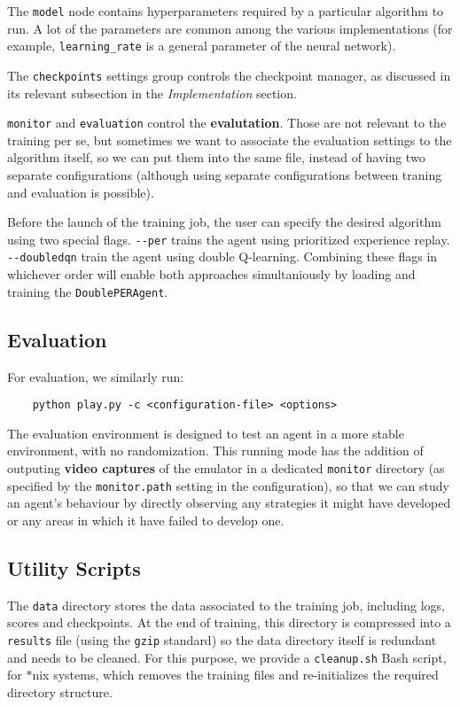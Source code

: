 The \verb|model| node contains hyperparameters required by a particular algorithm to run.
A lot of the parameters are common among the various implementations (for example, \verb|learning_rate| is a general parameter of the neural network).

The \verb|checkpoints| settings group controls the checkpoint manager, as discussed in its relevant subsection in the \emph{Implementation} section.

\verb|monitor| and \verb|evaluation| control the \textbf{evalutation}. Those are not relevant to the training per se, but sometimes we want to associate the evaluation settings to the algorithm itself, so we can put them into the same file, instead of having two separate configurations (although using separate configurations between traning and evaluation is possible).

Before the launch of the training job, the user can specify the desired algorithm using two special flags.
\verb|--per| trains the agent using prioritized experience replay.
\verb|--doubledqn| train the agent using double Q-learning.
Combining these flags in whichever order will enable both approaches simultaniously by loading and training the \verb|DoublePERAgent|.

\subsection*{Evaluation}
For evaluation, we similarly run:
\begin{verbatim}
    python play.py -c <configuration-file> <options>
\end{verbatim}

The evaluation environment is designed to test an agent in a more stable environment, with no randomization.
This running mode has the addition of outputing \textbf{video captures} of the emulator in a dedicated \verb|monitor| directory (as specified by the \verb|monitor.path| setting in the configuration), so that we can study an agent's behaviour by directly observing any strategies it might have developed or any areas in which it have failed to develop one.

\subsection*{Utility Scripts}
The \verb|data| directory stores the data associated to the training job, including logs, scores and checkpoints.
At the end of training, this directory is compressed into a \verb|results| file (using the \verb|gzip| standard) so the data directory itself is redundant and needs to be cleaned.
For this purpose, we provide a \verb|cleanup.sh| Bash script, for $*$nix systems, which removes the training files and re-initializes the required directory structure.


